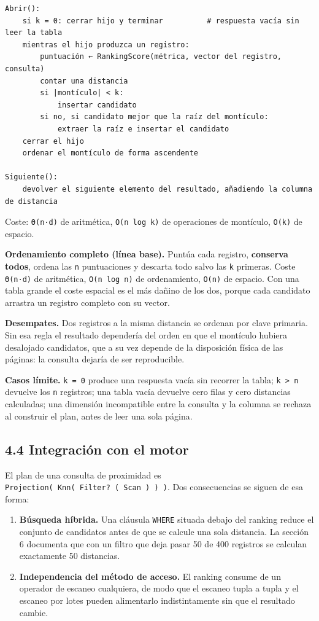 \documentclass[11pt,a4paper]{article}
\providecommand{\tightlist}{%
  \setlength{\itemsep}{0pt}\setlength{\parskip}{0pt}}
\let\pandocsubsection\subsection
\let\subsection\section
\let\subsubsection\pandocsubsection
\begin{document}
\begin{verbatim}
Abrir():
    si k = 0: cerrar hijo y terminar          # respuesta vacía sin leer la tabla
    mientras el hijo produzca un registro:
        puntuación ← RankingScore(métrica, vector del registro, consulta)
        contar una distancia
        si |montículo| < k:
            insertar candidato
        si no, si candidato mejor que la raíz del montículo:
            extraer la raíz e insertar el candidato
    cerrar el hijo
    ordenar el montículo de forma ascendente

Siguiente():
    devolver el siguiente elemento del resultado, añadiendo la columna de distancia
\end{verbatim}

Coste: \texttt{Θ(n·d)} de aritmética, \texttt{O(n\ log\ k)} de
operaciones de montículo, \texttt{O(k)} de espacio.

\textbf{Ordenamiento completo (línea base).} Puntúa cada registro,
\textbf{conserva todos}, ordena las \texttt{n} puntuaciones y descarta
todo salvo las \texttt{k} primeras. Coste \texttt{Θ(n·d)} de aritmética,
\texttt{O(n\ log\ n)} de ordenamiento, \texttt{O(n)} de espacio. Con una
tabla grande el coste espacial es el más dañino de los dos, porque cada
candidato arrastra un registro completo con su vector.

\textbf{Desempates.} Dos registros a la misma distancia se ordenan por
clave primaria. Sin esa regla el resultado dependería del orden en que
el montículo hubiera desalojado candidatos, que a su vez depende de la
disposición física de las páginas: la consulta dejaría de ser
reproducible.

\textbf{Casos límite.} \texttt{k\ =\ 0} produce una respuesta vacía sin
recorrer la tabla; \texttt{k\ \textgreater{}\ n} devuelve los \texttt{n}
registros; una tabla vacía devuelve cero filas y cero distancias
calculadas; una dimensión incompatible entre la consulta y la columna se
rechaza al construir el plan, antes de leer una sola página.

\subsubsection{4.4 Integración con el
motor}\label{44-integraciuxf3n-con-el-motor}

El plan de una consulta de proximidad es
\texttt{Projection(\ Knn(\ Filter?\ (\ Scan\ )\ )\ )}. Dos consecuencias
se siguen de esa forma:

\begin{enumerate}
\def\labelenumi{\arabic{enumi}.}
\tightlist
\item
  \textbf{Búsqueda híbrida.} Una cláusula \texttt{WHERE} situada debajo
  del ranking reduce el conjunto de candidatos antes de que se calcule
  una sola distancia. La sección 6 documenta que con un filtro que deja
  pasar 50 de 400 registros se calculan exactamente 50 distancias.
\item
  \textbf{Independencia del método de acceso.} El ranking consume de un
  operador de escaneo cualquiera, de modo que el escaneo tupla a tupla y
  el escaneo por lotes pueden alimentarlo indistintamente sin que el
  resultado cambie.
\end{enumerate}
\end{document}
